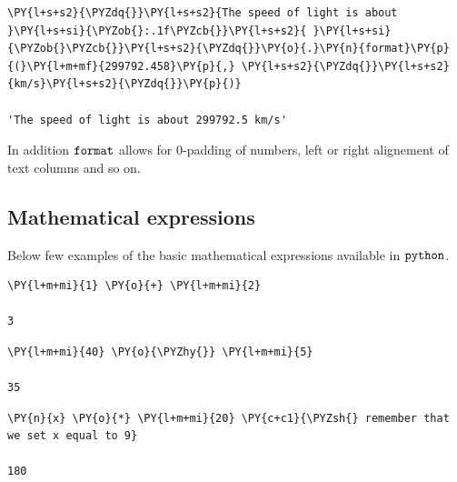 \begin{tcolorbox}[breakable, size=fbox, boxrule=1pt, pad at break*=1mm, colback=cellbackground, colframe=cellborder]            
\begin{Verbatim}[commandchars=\\\{\}]
\PY{l+s+s2}{\PYZdq{}}\PY{l+s+s2}{The speed of light is about }\PY{l+s+si}{\PYZob{}:.1f\PYZcb{}}\PY{l+s+s2}{ }\PY{l+s+si}{\PYZob{}\PYZcb{}}\PY{l+s+s2}{\PYZdq{}}\PY{o}{.}\PY{n}{format}\PY{p}{(}\PY{l+m+mf}{299792.458}\PY{p}{,} \PY{l+s+s2}{\PYZdq{}}\PY{l+s+s2}{km/s}\PY{l+s+s2}{\PYZdq{}}\PY{p}{)}

'The speed of light is about 299792.5 km/s'
\end{Verbatim}
\end{tcolorbox}

In addition $\tt{format}$ allows for 0-padding of numbers, left or right alignement of text columns and so on.

\subsection{Mathematical expressions}\label{mathematical-expressions}

Below few examples of the basic mathematical expressions available in $\tt{python}$.

\begin{tcolorbox}[breakable, size=fbox, boxrule=1pt, pad at break*=1mm, colback=cellbackground, colframe=cellborder]            
\begin{Verbatim}[commandchars=\\\{\}]
\PY{l+m+mi}{1} \PY{o}{+} \PY{l+m+mi}{2}

3
\end{Verbatim}
\end{tcolorbox}

\begin{tcolorbox}[breakable, size=fbox, boxrule=1pt, pad at break*=1mm, colback=cellbackground, colframe=cellborder]            
\begin{Verbatim}[commandchars=\\\{\}]
\PY{l+m+mi}{40} \PY{o}{\PYZhy{}} \PY{l+m+mi}{5}

35
\end{Verbatim}
\end{tcolorbox}

\begin{tcolorbox}[breakable, size=fbox, boxrule=1pt, pad at break*=1mm, colback=cellbackground, colframe=cellborder]            
\begin{Verbatim}[commandchars=\\\{\}]
\PY{n}{x} \PY{o}{*} \PY{l+m+mi}{20} \PY{c+c1}{\PYZsh{} remember that we set x equal to 9}

180
\end{Verbatim}
\end{tcolorbox}

